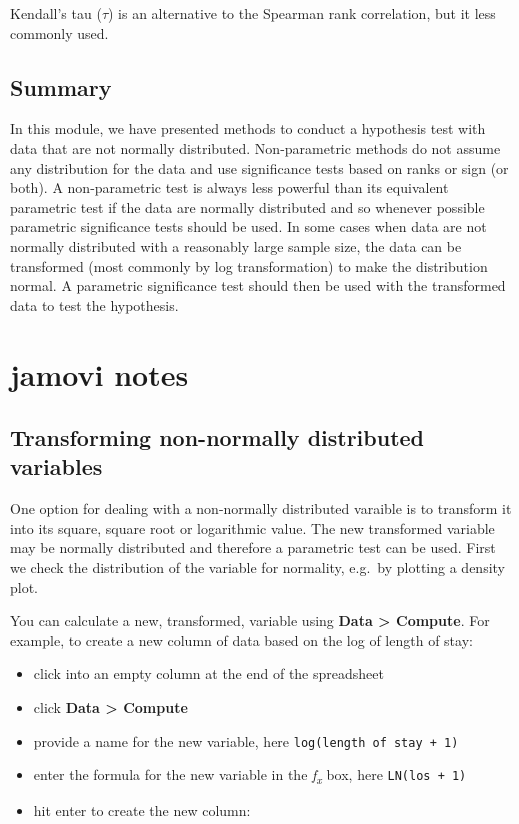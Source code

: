 \documentclass[
  a4paper,
]{memoir}
\providecommand{\tightlist}{%
  \setlength{\itemsep}{0pt}\setlength{\parskip}{0pt}}
\begin{document}
Kendall's tau (\(\tau\)) is an alternative to the Spearman rank
correlation, but it less commonly used.

\section{Summary}\label{summary-1}

In this module, we have presented methods to conduct a hypothesis test
with data that are not normally distributed. Non-parametric methods do
not assume any distribution for the data and use significance tests
based on ranks or sign (or both). A non-parametric test is always less
powerful than its equivalent parametric test if the data are normally
distributed and so whenever possible parametric significance tests
should be used. In some cases when data are not normally distributed
with a reasonably large sample size, the data can be transformed (most
commonly by log transformation) to make the distribution normal. A
parametric significance test should then be used with the transformed
data to test the hypothesis.

\newpage{}


\chapter*{jamovi notes}\label{jamovi-notes-7}


\section{Transforming non-normally distributed
variables}\label{transforming-non-normally-distributed-variables-1}

One option for dealing with a non-normally distributed varaible is to
transform it into its square, square root or logarithmic value. The new
transformed variable may be normally distributed and therefore a
parametric test can be used. First we check the distribution of the
variable for normality, e.g.~by plotting a density plot.

You can calculate a new, transformed, variable using \textbf{Data
\textgreater{} Compute}. For example, to create a new column of data
based on the log of length of stay:

\begin{itemize}
\tightlist
\item
  click into an empty column at the end of the spreadsheet
\item
  click \textbf{Data \textgreater{} Compute}
\item
  provide a name for the new variable, here
  \texttt{log(length\ of\ stay\ +\ 1)}
\item
  enter the formula for the new variable in the
  \emph{f\textsubscript{x}} box, here \texttt{LN(los\ +\ 1)}
\item
  hit enter to create the new column:
\end{itemize}
\end{document}
